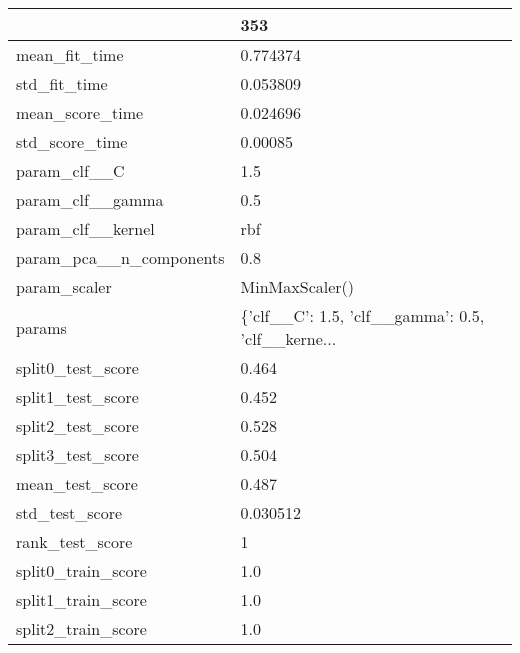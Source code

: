 \begin{tabular}{ll}
\toprule
{} &                                                353 \\
\midrule
mean\_fit\_time           &                                           0.774374 \\
std\_fit\_time            &                                           0.053809 \\
mean\_score\_time         &                                           0.024696 \\
std\_score\_time          &                                            0.00085 \\
param\_clf\_\_C            &                                                1.5 \\
param\_clf\_\_gamma        &                                                0.5 \\
param\_clf\_\_kernel       &                                                rbf \\
param\_pca\_\_n\_components &                                                0.8 \\
param\_scaler            &                                     MinMaxScaler() \\
params                  &  \{'clf\_\_C': 1.5, 'clf\_\_gamma': 0.5, 'clf\_\_kerne... \\
split0\_test\_score       &                                              0.464 \\
split1\_test\_score       &                                              0.452 \\
split2\_test\_score       &                                              0.528 \\
split3\_test\_score       &                                              0.504 \\
mean\_test\_score         &                                              0.487 \\
std\_test\_score          &                                           0.030512 \\
rank\_test\_score         &                                                  1 \\
split0\_train\_score      &                                                1.0 \\
split1\_train\_score      &                                                1.0 \\
split2\_train\_score      &                                                1.0 \\

\end{tabular}
